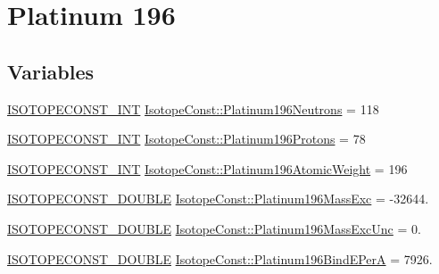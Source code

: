 \hypertarget{group___isotope_const-_platinum-_pt196}{}\section{Platinum 196}
\label{group___isotope_const-_platinum-_pt196}
\subsection*{Variables}
\begin{DoxyCompactItemize}
\item 
\mbox{\hyperlink{group___isotope_const-_macros_ga5f18360b3e99483a35c32d789e62621c}{I\+S\+O\+T\+O\+P\+E\+C\+O\+N\+S\+T\+\_\+\+I\+NT}} \mbox{\hyperlink{group___isotope_const-_platinum-_pt196_ga3c445ed0436e404033f2b29770f1dc5c}{Isotope\+Const\+::\+Platinum196\+Neutrons}} = 118
\item 
\mbox{\hyperlink{group___isotope_const-_macros_ga5f18360b3e99483a35c32d789e62621c}{I\+S\+O\+T\+O\+P\+E\+C\+O\+N\+S\+T\+\_\+\+I\+NT}} \mbox{\hyperlink{group___isotope_const-_platinum-_pt196_ga9f9f5c7262724cef796d6ee08cde7a20}{Isotope\+Const\+::\+Platinum196\+Protons}} = 78
\item 
\mbox{\hyperlink{group___isotope_const-_macros_ga5f18360b3e99483a35c32d789e62621c}{I\+S\+O\+T\+O\+P\+E\+C\+O\+N\+S\+T\+\_\+\+I\+NT}} \mbox{\hyperlink{group___isotope_const-_platinum-_pt196_gaa8961487b6ac7b7be5112c6539f10580}{Isotope\+Const\+::\+Platinum196\+Atomic\+Weight}} = 196
\item 
\mbox{\hyperlink{group___isotope_const-_macros_ga8f45a7272ce02c0b4c65c44636ed719a}{I\+S\+O\+T\+O\+P\+E\+C\+O\+N\+S\+T\+\_\+\+D\+O\+U\+B\+LE}} \mbox{\hyperlink{group___isotope_const-_platinum-_pt196_gaffc7c8239768ac56fefce366a18d0efd}{Isotope\+Const\+::\+Platinum196\+Mass\+Exc}} = -\/32644.
\item 
\mbox{\hyperlink{group___isotope_const-_macros_ga8f45a7272ce02c0b4c65c44636ed719a}{I\+S\+O\+T\+O\+P\+E\+C\+O\+N\+S\+T\+\_\+\+D\+O\+U\+B\+LE}} \mbox{\hyperlink{group___isotope_const-_platinum-_pt196_ga5ce37639e0675df3d1dad19927041c9a}{Isotope\+Const\+::\+Platinum196\+Mass\+Exc\+Unc}} = 0.
\item 
\mbox{\hyperlink{group___isotope_const-_macros_ga8f45a7272ce02c0b4c65c44636ed719a}{I\+S\+O\+T\+O\+P\+E\+C\+O\+N\+S\+T\+\_\+\+D\+O\+U\+B\+LE}} \mbox{\hyperlink{group___isotope_const-_platinum-_pt196_gadccc4565347e69bfc4284f4a30decee7}{Isotope\+Const\+::\+Platinum196\+Bind\+E\+PerA}} = 7926.
\item 

\end{DoxyCompactItemize}
